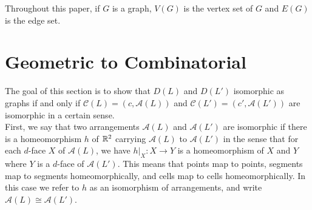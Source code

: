 \documentclass[11pt, oneside]{article}
\begin{document}
Throughout this paper, if $G$ is a graph, $V(G)$ is the vertex set of $G$ and $E(G)$ is the edge set.

\section{Geometric to Combinatorial}
The goal of this section is to show that $D(L)$ and $D(L')$ isomorphic as graphs if and only if $\mathcal{C}(L) = (c, \mathcal{A}(L))$ and $\mathcal{C}(L') = (c', \mathcal{A}(L'))$ are isomorphic in a certain sense.\\

 First, we say that two arrangements $\mathcal{A }(L)$ and $\mathcal{A} (L')$ are isomorphic if there is a homeomorphism $h$ of $\mathbb{R}^2$ carrying $\mathcal{A }(L)$ to $\mathcal{A} (L')$ in the sense that for each $d$-face $X$ of $\mathcal{A}(L)$, we have $h|_X: X \to Y$ is a homeomorphism of $X$ and $Y$ where $Y$ is a $d$-face of $\mathcal{A}(L')$. 
 This means that points map to points, segments map to segments homeomorphically, and cells map to cells homeomorphically. In this case we refer to $h$ as an isomorphism of arrangements, and write $\mathcal{A }(L) \cong \mathcal{A} (L')$. \\
\end{document}
